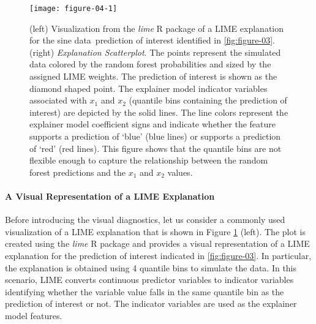 \documentclass[AMS,STIX2COL]{WileyNJD-v2}\usepackage[]{graphicx}\usepackage[]{color}
\newenvironment{knitrout}{}{} %
\newcommand{\data}{sine data}
\begin{document}
\begin{figure}[!thp]
\begin{knitrout}
\color{fgcolor}

{\centering \texttt{[image: figure-04-1]} 

}



\end{knitrout}
\caption{(left) Visualization from the \emph{lime} R package of a LIME explanation for the \data \ prediction of interest identified in \autoref{fig:figure-03}. (right) \emph{Explanation Scatterplot}. The points represent the simulated data colored by the random forest probabilities and sized by the assigned LIME weights. The prediction of interest is shown as the diamond shaped point. The explainer model indicator variables associated with $x_1$ and $x_2$ (quantile bins containing the prediction of interest) are depicted by the solid lines. The line colors represent the explainer model coefficient signs and indicate whether the feature supports a prediction of `blue' (blue lines) or supports a prediction of `red' (red lines). This figure shows that the quantile bins are not flexible enough to capture the relationship between the random forest predictions and the $x_1$ and $x_2$ values.}
\label{fig:figure-04}
\end{figure}

\paragraph{A Visual Representation of a LIME Explanation}

Before introducing the visual diagnostics, let us consider a commonly used visualization of a LIME explanation that is shown in Figure \ref{fig:figure-04} (left). The plot is created using the \emph{lime} R package and provides a visual representation of a LIME explanation for the prediction of interest indicated in \autoref{fig:figure-03}. In particular, the explanation is obtained using 4 quantile bins to simulate the data. In this scenario, LIME converts continuous predictor variables to indicator variables identifying whether the variable value falls in the same quantile bin as the prediction of interest or not. The indicator variables are used as the explainer model features.  
\end{document}
